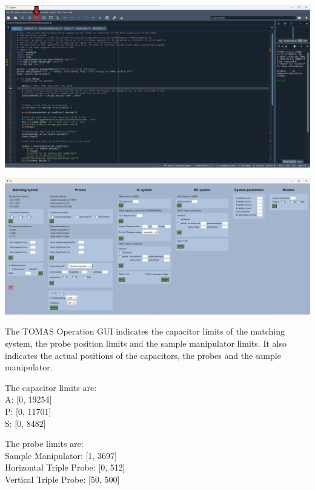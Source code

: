 \documentclass[fleqn,a4paper,20pt]{article}
\begin{document}
\begin{minipage}{0.49\textwidth}
	\includegraphics[height=0.7\linewidth]{Spyder2}
	\label{Spyder2}
\end{minipage}
\begin{minipage}{0.49\textwidth}
	\includegraphics[height=0.55\linewidth]{GUI1}
	\label{GUI1}
\end{minipage}
\vspace{0.5cm}

The TOMAS Operation GUI indicates the capacitor limits of the matching system, the probe position limits and the sample manipulator limits. It also indicates the actual positions of the capacitors, the probes and the sample manipulator.\\

\begin{minipage}{.5\textwidth}
The capacitor limits are:\\
A: [0, 19254]\\
P: [0, 11701]\\
S: [0, 8482]
\end{minipage}
\begin{minipage}{.5\textwidth}
The probe limits are:\\
Sample Manipulator: [1, 3697]\\
Horizontal Triple Probe: [0, 512]\\
Vertical Triple Probe: [50, 500]
\end{minipage}
\end{document}
